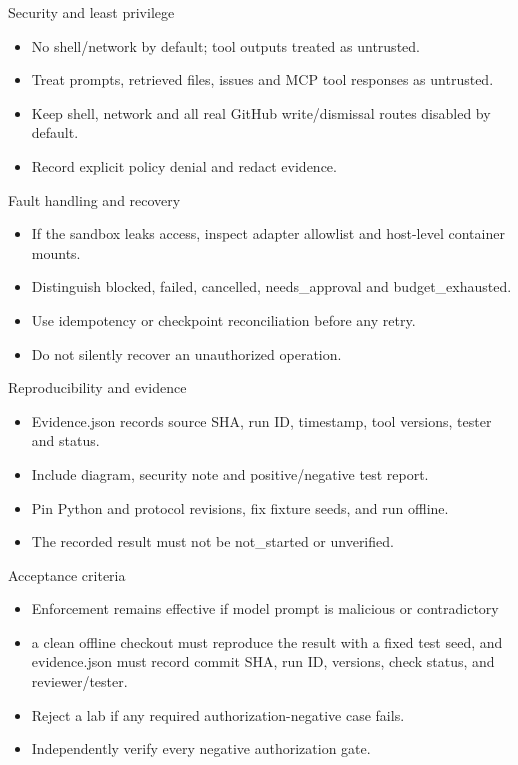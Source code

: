 \documentclass[aspectratio=169,10pt]{beamer}
\begin{document}
\begin{frame}{Security and least privilege}
\small
\begin{itemize}
\item No shell/network by default; tool outputs treated as untrusted.
\item Treat prompts, retrieved files, issues and MCP tool responses as untrusted.
\item Keep shell, network and all real GitHub write/dismissal routes disabled by default.
\item Record explicit policy denial and redact evidence.
\end{itemize}

\end{frame}

\begin{frame}{Fault handling and recovery}
\small
\begin{itemize}
\item If the sandbox leaks access, inspect adapter allowlist and host-level container mounts.
\item Distinguish blocked, failed, cancelled, needs\_approval and budget\_exhausted.
\item Use idempotency or checkpoint reconciliation before any retry.
\item Do not silently recover an unauthorized operation.
\end{itemize}

\end{frame}

\begin{frame}{Reproducibility and evidence}
\small
\begin{itemize}
\item Evidence.json records source SHA, run ID, timestamp, tool versions, tester and status.
\item Include diagram, security note and positive/negative test report.
\item Pin Python and protocol revisions, fix fixture seeds, and run offline.
\item The recorded result must not be not\_started or unverified.
\end{itemize}

\end{frame}

\begin{frame}{Acceptance criteria}
\small
\begin{itemize}
\item Enforcement remains effective if model prompt is malicious or contradictory
\item a clean offline checkout must reproduce the result with a fixed test seed, and evidence.json must record commit SHA, run ID, versions, check status, and reviewer/tester.
\item Reject a lab if any required authorization-negative case fails.
\item Independently verify every negative authorization gate.
\end{itemize}

\end{frame}
\end{document}

